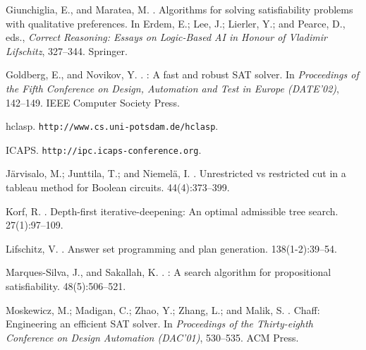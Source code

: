 \documentclass[letterpaper]{article}
\begin{document}
\begin{thebibliography}{}
Giunchiglia, E., and Maratea, M.
.
\newblock Algorithms for solving satisfiability problems with qualitative
  preferences.
\newblock In Erdem, E.; Lee, J.; Lierler, Y.; and Pearce, D., eds., {\em
  Correct Reasoning: Essays on Logic-Based {AI} in Honour of {V}ladimir
  {L}ifschitz},
  327--344.
\newblock Springer.

Goldberg, E., and Novikov, Y.
.
: A fast and robust {SAT} solver.
\newblock In {\em Proceedings of the Fifth Conference on Design, Automation and
  Test in Europe (DATE'02)},  142--149.
\newblock IEEE Computer Society Press.

\newblock hclasp. \texttt{http://www.cs.uni-potsdam.de/hclasp}.

\newblock ICAPS. \texttt{http://ipc.icaps-conference.org}.

J{\"a}rvisalo, M.; Junttila, T.; and Niemel{\"a}, I.
.
\newblock Unrestricted vs restricted cut in a tableau method for {B}oolean
  circuits.
  44(4):373--399.

Korf, R.
.
\newblock Depth-first iterative-deepening: An optimal admissible tree search.
 27(1):97--109.

Lifschitz, V.
.
\newblock Answer set programming and plan generation.
 138(1-2):39--54.

Marques-Silva, J., and Sakallah, K.
.
: A search algorithm for propositional satisfiability.
 48(5):506--521.

Moskewicz, M.; Madigan, C.; Zhao, Y.; Zhang, L.; and Malik, S.
.
\newblock Chaff: Engineering an efficient {SAT} solver.
\newblock In {\em Proceedings of the Thirty-eighth Conference on Design
  Automation (DAC'01)},  530--535.
\newblock ACM Press.


\end{thebibliography}
\end{document}
